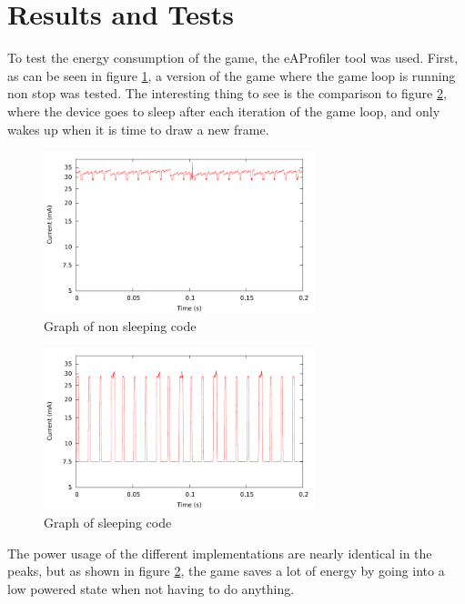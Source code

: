 \section{Results and Tests}
To test the energy consumption of the game, the eAProfiler tool was used. First,
as can be seen in figure \ref{fig:nosleep}, a version of the game where the game loop
is running non stop was tested. The interesting thing to see is the comparison
to figure \ref{fig:sleep}, where the device goes to sleep after each iteration
of the game loop, and only wakes up when it is time to draw a new frame.

\begin{figure}[H]
\centering
\includegraphics[width=0.7\textwidth]{figures/nosleep.pdf}
\caption{Graph of non sleeping code}
\label{fig:nosleep}
\end{figure}

\begin{figure}[H]
\centering
\includegraphics[width=0.7\textwidth]{figures/sleep.pdf}
\caption{Graph of sleeping code}
\label{fig:sleep}
\end{figure}

The power usage of the different implementations are nearly identical in the
peaks, but as shown in figure \ref{fig:sleep}, the game saves a lot of energy by
going into a low powered state when not having to do anything.
